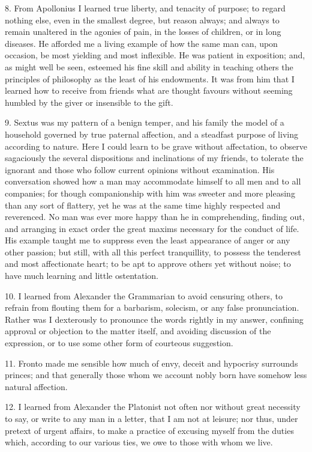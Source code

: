 \documentclass{book}
\begin{document}
\newpage

8. From Apollonius I learned true liberty, and tenacity of purpose; to
regard nothing else, even in the smallest degree, but reason always;
and always to remain unaltered in the agonies of pain, in the losses
of children, or in long diseases. He afforded me a living example of
how the same man can, upon occasion, be most yielding and most
inflexible. He was patient in exposition; and, as might well be seen,
esteemed his fine skill and ability in teaching others the principles
of philosophy as the least of his endowments. It was from him that I
learned how to receive from friends what are thought favours without
seeming humbled by the giver or insensible to the gift.

9. Sextus was my pattern of a benign temper, and his family the model
of a household governed by true paternal affection, and a steadfast
purpose of living according to nature. Here I could learn to be grave
without affectation, to observe sagaciously the several dispositions
and inclinations of my friends, to tolerate the ignorant and those who
follow current opinions without examination. His conversation showed
how a man may accommodate himself to all men and to all companies; for
though companionship with him was sweeter and more pleasing than any
sort of flattery, yet he was at the same time highly respected and
reverenced. No man was ever more happy than he in comprehending,
finding out, and arranging in exact order the great maxims necessary
for the conduct of life. His example taught me to suppress even the
least appearance of anger or any other passion; but still, with all
this perfect tranquillity, to possess the tenderest and most
affectionate heart; to be apt to approve others yet without noise; to
have much learning and little ostentation.

10. I learned from Alexander the Grammarian to avoid censuring others,
to refrain from flouting them for a barbarism, solecism, or any false
pronunciation. Rather was I dexterously to pronounce the words rightly
in my answer, confining approval or objection to the matter itself,
and avoiding discussion of the expression, or to use some other form
of courteous suggestion.

11. Fronto made me sensible how much of envy, deceit and hypocrisy
surrounds princes; and that generally those whom we account nobly born
have somehow less natural affection.

12. I learned from Alexander the Platonist not often nor without great
necessity to say, or write to any man in a letter, that I am not at
leisure; nor thus, under pretext of urgent affairs, to make a practice
of excusing myself from the duties which, according to our various
ties, we owe to those with whom we live.
\end{document}
